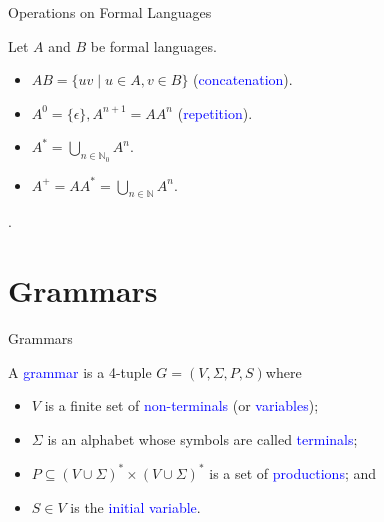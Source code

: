 \documentclass{beamer}
\def\b{\textcolor{blue}}
\begin{document}
\begin{frame}{Operations on Formal Languages}
    \begin{definition}
        Let $A$ and $B$ be formal languages.
        \begin{itemize}
            \item $AB = \{uv \mid u \in A, v \in B\}$ (\b{concatenation}).\pause
            \item $A^0 = \{\epsilon\}, A^{n+1} = AA^n$ (\b{repetition}).\pause
            \item $A^* = \bigcup_{n \in \mathbb{N}_0} A^n$.\pause
            \item $A^+ = AA^* = \bigcup_{n \in \mathbb{N}} A^n$.
        \end{itemize}.
    \end{definition}
\end{frame}

\section{Grammars}

\begin{frame}{Grammars}
    \begin{definition}
        A \b{grammar} is a 4-tuple $G = (V, \Sigma, P, S)$\pause where
        \begin{itemize}
            \item $V$ is a finite set of \b{non-terminals} (or \b{variables})\pause;
            \item $\Sigma$ is an alphabet whose symbols are called \b{terminals}\pause;
            \item $P \subseteq (V \cup \Sigma)^* \times (V \cup \Sigma)^*$ is a set of \b{productions}\pause; and
            \item $S \in V$ is the \b{initial variable}.
        \end{itemize}
    \end{definition}
\end{frame}
\end{document}
